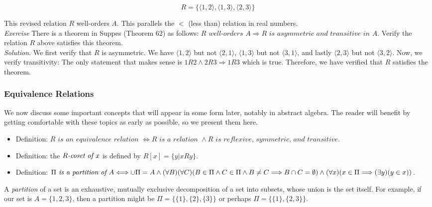 \begin{displaymath}
R=\{ \langle 1,2 \rangle, \langle 1,3 \rangle, \langle 2,3 \rangle\}
\end{displaymath}

This revised relation $R$ well-orders $A$.  This parallels the $<$ (less than) relation in real numbers.\\

\textit{Exercise} There is a theorem in Suppes (Theorem 62) as follows:  $R \textit{ well-orders } A \Longrightarrow R \textit{ is asymmetric and transitive in } A.$  Verify the relation $R$ above satisfies this theorem.\\

\textit{Solution}.  We first verify that $R$ is asymmetric.  We have $\langle 1,2 \rangle$ but not $\langle 2,1 \rangle$, $\langle 1,3 \rangle$ but not $\langle 3,1 \rangle$, and lastly $\langle 2,3 \rangle$ but not $\langle 3,2 \rangle$.  Now, we verify transitivity:  The only statement that makes sense is $1R2 \land 2R3 \Longrightarrow 1R3$ which is true.  Therefore, we have verified that $R$ satisfies the theorem.

\subsubsection{Equivalence Relations}

We now discuss some important concepts that will appear in some form later, notably in abstract algebra.  The reader will benefit by getting comfortable with these topics as early as possible, so we present them here.

\begin{itemize}
\item Definition:  $R \textit{ is an equivalence relation } \Longleftrightarrow R \textit{ is a relation } \land R \textit{ is reflexive, symmetric, and transitive}$.
\item Definition: the $R \textit{-coset of }\index{Coset} x$ is defined by $R[x]=\{y | x R y\}$.
\item Definition: $\Pi \textit{ is a partition of }\index{Partition} A \Longleftrightarrow \cup \Pi = A \land (\forall B)(\forall C)(B \in \Pi \land C \in \Pi \land B \ne C \Longrightarrow B \cap C = \emptyset) \land (\forall x)(x \in \Pi \Longrightarrow (\exists y)(y \in x))$.
\end{itemize}

A \textit{partition} of a set is an exhaustive, mutually exclusive decomposition of a set into subsets, whose union is the set itself.  For example, if our set is $A=\{1,2,3\}$, then a partition might be $\Pi = \{\{1\},\{2\}, \{3\} \}$ or perhaps $\Pi = \{\{1\},\{2, 3\} \}$.\\

